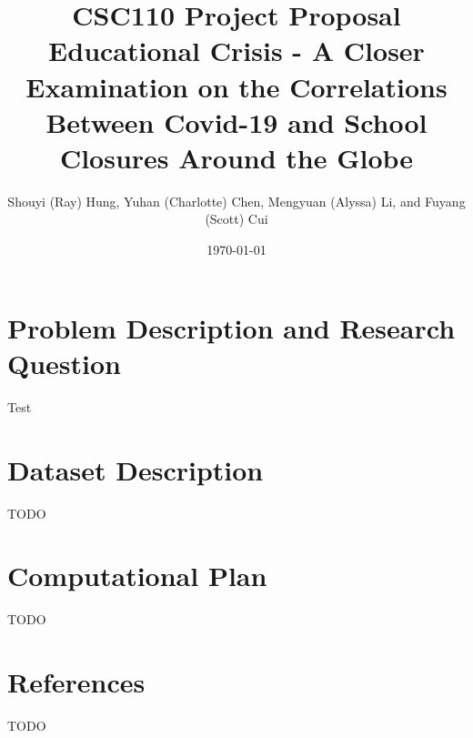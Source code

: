 \documentclass[fontsize=11pt]{article}
\title{CSC110 Project Proposal\\ Educational Crisis - A Closer Examination on the Correlations Between Covid-19 and School Closures Around the Globe}
\author{Shouyi (Ray) Hung, Yuhan (Charlotte) Chen, Mengyuan (Alyssa) Li, and Fuyang (Scott) Cui}
\date{\today}
\begin{document}
\maketitle

\section*{Problem Description and Research Question}

Test

\section*{Dataset Description}

TODO

\section*{Computational Plan}

TODO

\section*{References}

TODO

\end{document}
